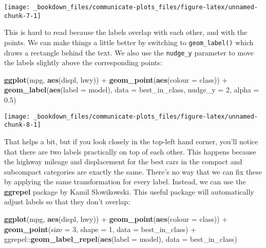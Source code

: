 \documentclass[]{book}
\newenvironment{Shaded}{\begin{snugshade}}{\end{snugshade}}
\newcommand{\KeywordTok}[1]{\textcolor[rgb]{0.13,0.29,0.53}{\textbf{{#1}}}}
\newcommand{\DataTypeTok}[1]{\textcolor[rgb]{0.13,0.29,0.53}{{#1}}}
\newcommand{\DecValTok}[1]{\textcolor[rgb]{0.00,0.00,0.81}{{#1}}}
\newcommand{\FloatTok}[1]{\textcolor[rgb]{0.00,0.00,0.81}{{#1}}}
\newcommand{\StringTok}[1]{\textcolor[rgb]{0.31,0.60,0.02}{{#1}}}
\newcommand{\NormalTok}[1]{{#1}}
\begin{document}
\begin{center}\texttt{[image: \_bookdown\_files/communicate-plots\_files/figure-latex/unnamed-chunk-7-1]} \end{center}

This is hard to read because the labels overlap with each other, and
with the points. We can make things a little better by switching to
\texttt{geom\_label()} which draws a rectangle behind the text. We also
use the \texttt{nudge\_y} parameter to move the labels slightly above
the corresponding points:

\begin{Shaded}
\begin{Highlighting}[]
\KeywordTok{ggplot}\NormalTok{(mpg, }\KeywordTok{aes}\NormalTok{(displ, hwy)) +}
\StringTok{  }\KeywordTok{geom_point}\NormalTok{(}\KeywordTok{aes}\NormalTok{(}\DataTypeTok{colour =} \NormalTok{class)) +}
\StringTok{  }\KeywordTok{geom_label}\NormalTok{(}\KeywordTok{aes}\NormalTok{(}\DataTypeTok{label =} \NormalTok{model), }\DataTypeTok{data =} \NormalTok{best_in_class, }\DataTypeTok{nudge_y =} \DecValTok{2}\NormalTok{, }\DataTypeTok{alpha =} \FloatTok{0.5}\NormalTok{)}
\end{Highlighting}
\end{Shaded}

\begin{center}\texttt{[image: \_bookdown\_files/communicate-plots\_files/figure-latex/unnamed-chunk-8-1]} \end{center}

That helps a bit, but if you look closely in the top-left hand corner,
you'll notice that there are two labels practically on top of each
other. This happens because the highway mileage and displacement for the
best cars in the compact and subcompact categories are exactly the same.
There's no way that we can fix these by applying the same transformation
for every label. Instead, we can use the \textbf{ggrepel} package by
Kamil Slowikowski. This useful package will automatically adjust labels
so that they don't overlap:

\begin{Shaded}
\begin{Highlighting}[]
\KeywordTok{ggplot}\NormalTok{(mpg, }\KeywordTok{aes}\NormalTok{(displ, hwy)) +}
\StringTok{  }\KeywordTok{geom_point}\NormalTok{(}\KeywordTok{aes}\NormalTok{(}\DataTypeTok{colour =} \NormalTok{class)) +}
\StringTok{  }\KeywordTok{geom_point}\NormalTok{(}\DataTypeTok{size =} \DecValTok{3}\NormalTok{, }\DataTypeTok{shape =} \DecValTok{1}\NormalTok{, }\DataTypeTok{data =} \NormalTok{best_in_class) +}
\StringTok{  }\NormalTok{ggrepel::}\KeywordTok{geom_label_repel}\NormalTok{(}\KeywordTok{aes}\NormalTok{(}\DataTypeTok{label =} \NormalTok{model), }\DataTypeTok{data =} \NormalTok{best_in_class)}
\end{Highlighting}
\end{Shaded}
\end{document}
